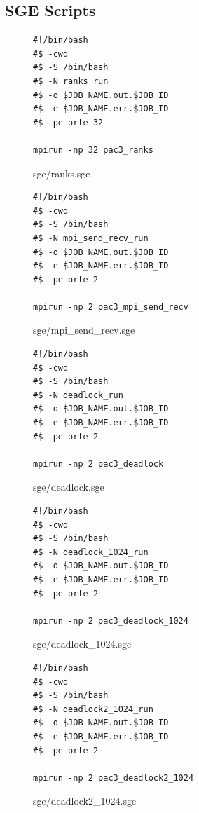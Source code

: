 \documentclass[12pt]{article}
\begin{document}
\newpage

\subsection*{SGE Scripts}

\begin{figure}[h!]
	\begin{verbatim}
#!/bin/bash
#$ -cwd
#$ -S /bin/bash
#$ -N ranks_run
#$ -o $JOB_NAME.out.$JOB_ID
#$ -e $JOB_NAME.err.$JOB_ID
#$ -pe orte 32

mpirun -np 32 pac3_ranks
	\end{verbatim}
	\caption{sge/ranks.sge}\label{code:rankssge}
\end{figure}

\begin{figure}[h!]
	\begin{verbatim}
#!/bin/bash
#$ -cwd
#$ -S /bin/bash
#$ -N mpi_send_recv_run
#$ -o $JOB_NAME.out.$JOB_ID
#$ -e $JOB_NAME.err.$JOB_ID
#$ -pe orte 2

mpirun -np 2 pac3_mpi_send_recv
	\end{verbatim}
	\caption{sge/mpi\_send\_recv.sge}\label{code:sandr}
\end{figure}


\begin{figure}[h!]
	\begin{verbatim}
#!/bin/bash
#$ -cwd
#$ -S /bin/bash
#$ -N deadlock_run
#$ -o $JOB_NAME.out.$JOB_ID
#$ -e $JOB_NAME.err.$JOB_ID
#$ -pe orte 2

mpirun -np 2 pac3_deadlock
	\end{verbatim}
	\caption{sge/deadlock.sge}\label{code:deadlocksge}
\end{figure}

\newpage

\begin{figure}[h!]
	\begin{verbatim}
#!/bin/bash
#$ -cwd
#$ -S /bin/bash
#$ -N deadlock_1024_run
#$ -o $JOB_NAME.out.$JOB_ID
#$ -e $JOB_NAME.err.$JOB_ID
#$ -pe orte 2

mpirun -np 2 pac3_deadlock_1024
	\end{verbatim}
	\caption{sge/deadlock\_1024.sge}\label{code:deadlocksge}
\end{figure}

\begin{figure}[h!]
	\begin{verbatim}
#!/bin/bash
#$ -cwd
#$ -S /bin/bash
#$ -N deadlock2_1024_run
#$ -o $JOB_NAME.out.$JOB_ID
#$ -e $JOB_NAME.err.$JOB_ID
#$ -pe orte 2

mpirun -np 2 pac3_deadlock2_1024
	\end{verbatim}
	\caption{sge/deadlock2\_1024.sge}\label{code:deadlocksge}
\end{figure}
\end{document}
